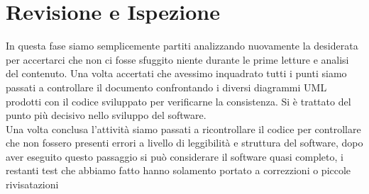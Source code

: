 \documentclass[a4paper, 11pt,oneside]{book}
\begin{document}
    \section{Revisione e Ispezione}
        In questa fase siamo semplicemente partiti analizzando nuovamente la desiderata per accertarci che non ci fosse sfuggito niente durante le prime letture e analisi del contenuto. Una volta accertati che avessimo inquadrato tutti i punti siamo passati a controllare il documento
        confrontando i diversi diagrammi UML prodotti con il codice sviluppato per verificarne la consistenza. Si è trattato del punto più decisivo nello sviluppo del software.\\
        Una volta conclusa l'attività siamo passati a ricontrollare il codice per controllare che non fossero presenti errori a livello di leggibilità e struttura del software, dopo aver eseguito questo passaggio si può considerare il software quasi completo, i restanti test che abbiamo fatto
        hanno solamento portato a correzzioni o piccole rivisatazioni
\end{document}
